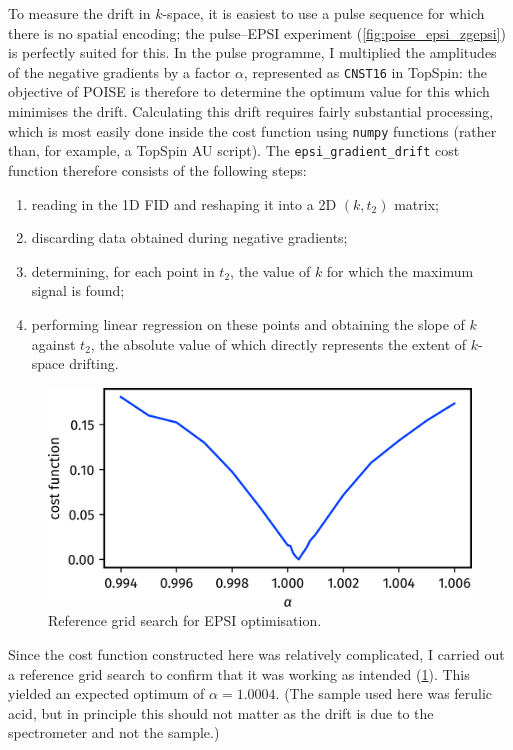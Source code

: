 To measure the drift in $k$-space, it is easiest to use a pulse sequence for which there is no spatial encoding; the pulse--EPSI experiment (\cref{fig:poise_epsi_zgepsi}) is perfectly suited for this.
In the pulse programme, I multiplied the amplitudes of the negative gradients by a factor $\alpha$, represented as \texttt{CNST16} in TopSpin:
the objective of POISE is therefore to determine the optimum value for this which minimises the drift.
Calculating this drift requires fairly substantial processing, which is most easily done inside the cost function using \texttt{numpy} functions (rather than, for example, a TopSpin AU script).
The \texttt{epsi\_gradient\_drift} cost function therefore consists of the following steps:
\begin{enumerate}
    \item reading in the 1D FID and reshaping it into a 2D $(k, t_2)$ matrix;
    \item discarding data obtained during negative gradients;
    \item determining, for each point in $t_2$, the value of $k$ for which the maximum signal is found;
    \item performing linear regression on these points and obtaining the slope of $k$ against $t_2$, the absolute value of which directly represents the extent of $k$-space drifting.
\end{enumerate}

\begin{figure}[htb]
    \centering
    \includegraphics[]{figures/poise/epsi_scan.png}
    \caption[Reference grid search for EPSI optimisation]{
        Reference grid search for EPSI optimisation.
    }
    \label{fig:poise_epsi_scan}
\end{figure}

Since the cost function constructed here was relatively complicated, I carried out a reference grid search to confirm that it was working as intended (\cref{fig:poise_epsi_scan}).
This yielded an expected optimum of $\alpha = 1.0004$.
(The sample used here was ferulic acid, but in principle this should not matter as the drift is due to the spectrometer and not the sample.)

